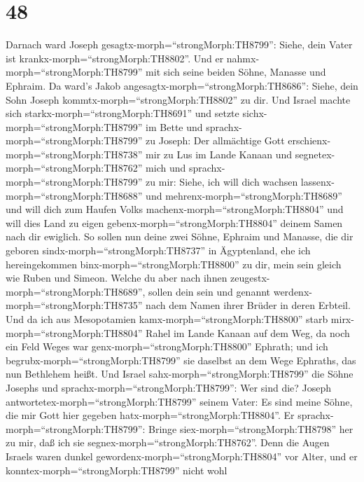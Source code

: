 \hypertarget{section-47}{%
\section{48}\label{section-47}}

 Darnach ward Joseph gesagtx-morph=``strongMorph:TH8799'':
Siehe, dein Vater ist krankx-morph=``strongMorph:TH8802''. Und er
nahmx-morph=``strongMorph:TH8799'' mit sich seine beiden Söhne, Manasse
und Ephraim.  Da ward's Jakob
angesagtx-morph=``strongMorph:TH8686'': Siehe, dein Sohn Joseph
kommtx-morph=``strongMorph:TH8802'' zu dir. Und Israel machte sich
starkx-morph=``strongMorph:TH8691'' und setzte
sichx-morph=``strongMorph:TH8799'' im Bette  und
sprachx-morph=``strongMorph:TH8799'' zu Joseph: Der allmächtige Gott
erschienx-morph=``strongMorph:TH8738'' mir zu Lus im Lande Kanaan und
segnetex-morph=``strongMorph:TH8762'' mich  und
sprachx-morph=``strongMorph:TH8799'' zu mir: Siehe, ich will dich
wachsen lassenx-morph=``strongMorph:TH8688'' und
mehrenx-morph=``strongMorph:TH8689'' und will dich zum Haufen Volks
machenx-morph=``strongMorph:TH8804'' und will dies Land zu eigen
gebenx-morph=``strongMorph:TH8804'' deinem Samen nach dir ewiglich.
 So sollen nun deine zwei Söhne, Ephraim und Manasse, die
dir geboren sindx-morph=``strongMorph:TH8737'' in Ägyptenland, ehe ich
hereingekommen binx-morph=``strongMorph:TH8800'' zu dir, mein sein
gleich wie Ruben und Simeon.  Welche du aber nach ihnen
zeugestx-morph=``strongMorph:TH8689'', sollen dein sein und genannt
werdenx-morph=``strongMorph:TH8735'' nach dem Namen ihrer Brüder in
deren Erbteil.  Und da ich aus Mesopotamien
kamx-morph=``strongMorph:TH8800'' starb
mirx-morph=``strongMorph:TH8804'' Rahel im Lande Kanaan auf dem Weg, da
noch ein Feld Weges war genx-morph=``strongMorph:TH8800'' Ephrath; und
ich begrubx-morph=``strongMorph:TH8799'' sie daselbst an dem Wege
Ephraths, das nun Bethlehem heißt.  Und Israel
sahx-morph=``strongMorph:TH8799'' die Söhne Josephs und
sprachx-morph=``strongMorph:TH8799'': Wer sind die?  Joseph
antwortetex-morph=``strongMorph:TH8799'' seinem Vater: Es sind meine
Söhne, die mir Gott hier gegeben hatx-morph=``strongMorph:TH8804''. Er
sprachx-morph=``strongMorph:TH8799'': Bringe
siex-morph=``strongMorph:TH8798'' her zu mir, daß ich sie
segnex-morph=``strongMorph:TH8762''.  Denn die Augen
Israels waren dunkel gewordenx-morph=``strongMorph:TH8804'' vor Alter,
und er konntex-morph=``strongMorph:TH8799'' nicht wohl
